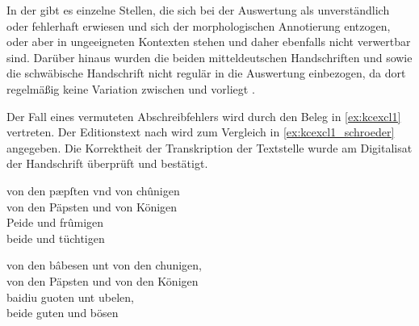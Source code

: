 In der \KC{} gibt es einzelne Stellen, die sich bei der Auswertung als
unverständlich oder fehlerhaft erwiesen und sich der morphologischen
Annotierung entzogen, oder aber in ungeeigneten Kontexten stehen und daher
ebenfalls nicht verwertbar sind. Darüber hinaus wurden die beiden
mitteldeutschen Handschriften \citet{kc:H} und \citet{kc:P} sowie die
schwäbische Handschrift \citet{kc:Z} nicht regulär in die Auswertung
einbezogen, da dort regelmäßig keine Variation zwischen  und
 vorliegt \autocite[vgl. auch][183]{ksw2}.

Der Fall eines vermuteten Abschreibfehlers wird durch den Beleg in
\cref{ex:kcexcl1} vertreten. Der Editionstext nach \nosh\citet{schroeder1895}
wird zum Vergleich in \cref{ex:kcexcl1_schroeder} angegeben. Die Korrektheit
der Transkription der Textstelle wurde am Digitalisat der Handschrift überprüft
und bestätigt.

\begin{exe}
\ex \begin{xlist}
	\ex \label{ex:kcexcl1}
		\gll von den pæpſten vnd von chûnigen \\
			von den Päpsten und von Königen \\
	\sn \gll Peide und frûmigen \\
			beide und tüchtigen \\
		\begin{taggedline}{\parencite[\pno~2\va, 20--21]{kc:B1}}
		\trans {}
		\end{taggedline}

	\ex \label{ex:kcexcl1_schroeder}
		\gll von den bâbesen unt von den chunigen, \\
			von den Päpsten und von den Königen \\
	\sn \gll baidiu guoten unt ubelen, \\
			beide guten und bösen \\
		\begin{taggedline}{\parencite[19--20]{schroeder1895}}
		\trans {}
		\end{taggedline}
\end{xlist}
\end{exe}

